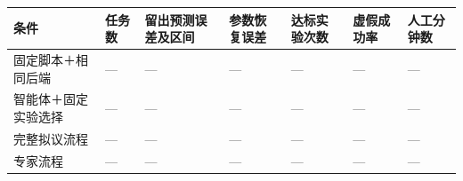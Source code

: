 \documentclass[
  chinese,
  11pt,
  a4paper,
  fontset=fandol]{ctexart}
\newcounter{none} %
\begin{document}
{\def\LTcaptype{none} %
\begin{longtable}[]{@{}
  >{\raggedright\arraybackslash}p{}
  >{\raggedleft\arraybackslash}p{}
  >{\raggedright\arraybackslash}p{}
  >{\raggedright\arraybackslash}p{}
  >{\raggedright\arraybackslash}p{}
  >{\raggedright\arraybackslash}p{}
  >{\raggedright\arraybackslash}p{}@{}}
\toprule\noalign{}
\begin{minipage}[b]{\linewidth}\raggedright
条件
\end{minipage} & \begin{minipage}[b]{\linewidth}\raggedleft
任务数
\end{minipage} & \begin{minipage}[b]{\linewidth}\raggedright
留出预测误差及区间
\end{minipage} & \begin{minipage}[b]{\linewidth}\raggedright
参数恢复误差
\end{minipage} & \begin{minipage}[b]{\linewidth}\raggedright
达标实验次数
\end{minipage} & \begin{minipage}[b]{\linewidth}\raggedright
虚假成功率
\end{minipage} & \begin{minipage}[b]{\linewidth}\raggedright
人工分钟数
\end{minipage} \\
\midrule\noalign{}
\endhead
\bottomrule\noalign{}
\endlastfoot
固定脚本＋相同后端 & --- & --- & --- & --- & --- & --- \\
智能体＋固定实验选择 & --- & --- & --- & --- & --- & --- \\
完整拟议流程 & --- & --- & --- & --- & --- & --- \\
专家流程 & --- & --- & --- & --- & --- & --- \\
\end{longtable}
}
\end{document}
